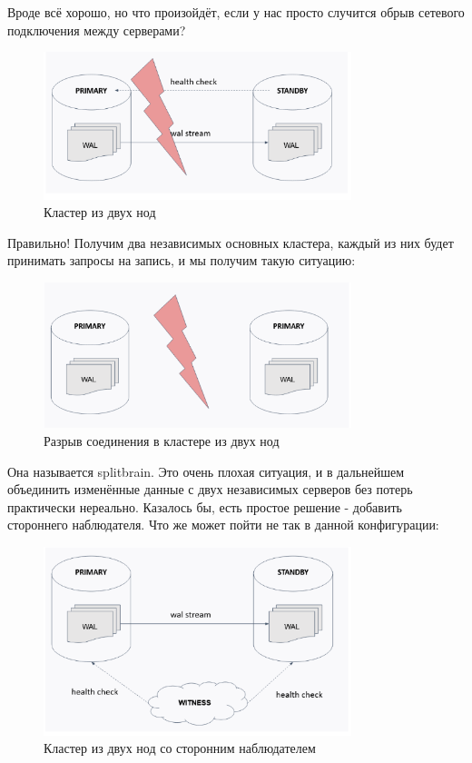 Вроде всё хорошо, но что произойдёт, если у нас просто случится обрыв сетевого подключения между серверами?

\begin{figure}[h]
    \centering
    \includegraphics[width=0.8\textwidth]{assets/Patroni2.png}
    \caption{Кластер из двух нод}
    \label{fig:mesh4}
\end{figure}

Правильно! Получим два независимых основных кластера, каждый из них будет принимать запросы на запись, и мы получим такую ситуацию:

\begin{figure}[h]
    \centering
    \includegraphics[width=0.8\textwidth]{assets/Patroni3.png}
    \caption{Разрыв соединения в кластере из двух нод}
    \label{fig:mesh5}
\end{figure}

Она называется splitbrain. Это очень плохая ситуация, и в дальнейшем объединить изменённые данные с двух независимых серверов без потерь практически нереально.
Казалось бы, есть простое решение - добавить стороннего наблюдателя.
Что же может пойти не так в данной конфигурации:

\begin{figure}[h]
    \centering
    \includegraphics[width=0.8\textwidth]{assets/Patroni4.png}
    \caption{Кластер из двух нод со сторонним наблюдателем}
    \label{fig:mesh6}
\end{figure}

